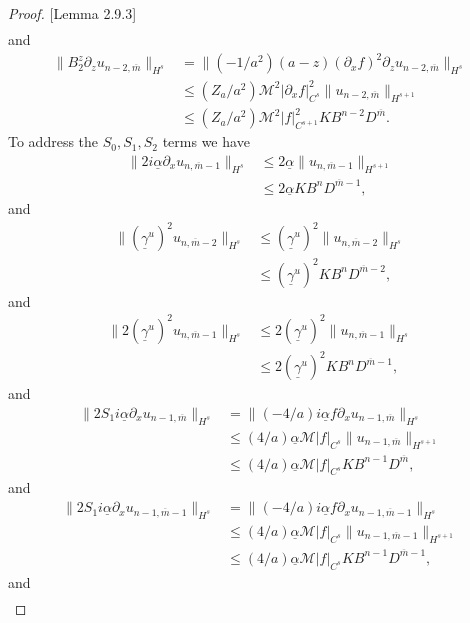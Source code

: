 \begin{proof}{[Lemma 2.9.3]}
\begin{align*}
\end{align*}
and
\begin{align*}
\|B_2^{z}\partial_z u_{n-2,\overline{m}}\|_{H^{s}} &= 
\|(-1/a^2)(a-z)(\partial_x f)^2\partial_z u_{n-2,\overline{m}}\|_{H^{s}}\\&\le
(Z_a/a^2)\mathcal{M}^2|\partial_x f|_{C^{s}}^2\|u_{n-2, \overline{m}}\|_{H^{s+1}} \\&\le
(Z_a/a^2)\mathcal{M}^2|f|_{C^{s+1}}^2KB^{n-2}D^{\overline{m}}.
\end{align*}
To address the $S_0,S_1,S_2$ terms we have
\begin{align*}
\|2i\underline{\alpha}\partial_xu_{n,\overline{m}-1}\|_{H^{s}}&\le
2\underline{\alpha}\|u_{n, \overline{m}-1}\|_{H^{s+1}}\\&\le
2\underline{\alpha}KB^{n}D^{\overline{m}-1},
\end{align*}
and
\begin{align*}
\|(\underline{\gamma}^u)^2u_{n,\overline{m}-2}\|_{H^{s}}&\le
(\underline{\gamma}^u)^2\|u_{n,\overline{m}-2}\|_{H^{s}}\\&\le
(\underline{\gamma}^u)^2KB^{n}D^{\overline{m}-2},
\end{align*}
and
\begin{align*}
\|2(\underline{\gamma}^u)^2u_{n,\overline{m}-1}\|_{H^{s}}&\le
2(\underline{\gamma}^u)^2\|u_{n,\overline{m}-1}\|_{H^{s}}\\&\le
2(\underline{\gamma}^u)^2KB^{n}D^{\overline{m}-1},
\end{align*}
and
\begin{align*}
\|2S_1i\underline{\alpha}\partial_xu_{n-1,\overline{m}}\|_{H^{s}}&=\|(-4/a)i\underline{\alpha}f\partial_xu_{n-1,\overline{m}}\|_{H^{s}}\\&\le
(4/a)\underline{\alpha}\mathcal{M}|f|_{C^{s}}\|u_{n-1, \overline{m}}\|_{H^{s+1}}\\&\le
(4/a)\underline{\alpha}\mathcal{M}|f|_{C^{s}}KB^{n-1}D^{\overline{m}},
\end{align*}
and
\begin{align*}
\|2S_1i\underline{\alpha}\partial_xu_{n-1,\overline{m}-1}\|_{H^{s}}&=\|(-4/a)i\underline{\alpha}f\partial_xu_{n-1,\overline{m}-1}\|_{H^{s}}\\&\le
(4/a)\underline{\alpha}\mathcal{M}|f|_{C^{s}}\|u_{n-1, \overline{m}-1}\|_{H^{s+1}}\\&\le
(4/a)\underline{\alpha}\mathcal{M}|f|_{C^{s}}KB^{n-1}D^{\overline{m}-1},
\end{align*}
and
\begin{align*}

\end{align*}
\end{proof}

